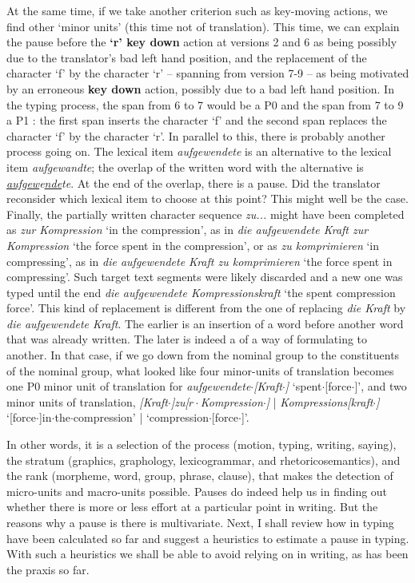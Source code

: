 \documentclass[output=paper]{LSP/langsci}
\begin{document}
  
At the same time, if we take another criterion such as key-moving actions, we find other `minor units' (this time not of translation). This time, we can explain the pause before the \textbf{`r' key down} action at versions 2 and 6 as being possibly due to the translator's bad left hand position, and the replacement of the character `f' by the character `r' -- spanning from version 7-9 -- as being motivated by an erroneous \textbf{key down} action, possibly due to a bad left hand position. In the typing process, the span from 6 to 7 would be a P0  and the span from 7 to 9 a P1 : the first span inserts the character `f' and the second span replaces the character `f' by the character `r'. In parallel to this, there is probably another process going on. The lexical item \emph{aufgewendete} is an alternative to the lexical item \emph{aufgewandte}; the overlap of the written word with the alternative is \emph{\uline{aufgew}e\uline{nde}te}. At the end of the overlap, there is a pause. Did the translator reconsider which lexical item to choose at this point? This might well be the case. Finally, the partially written character sequence \emph{zu...} might have been completed as \emph{zur Kompression} `in the compression', as in \emph{die aufgewendete Kraft zur Kompression} `the force spent in the compression', or as \emph{zu komprimieren} `in compressing', as in \emph{die aufgewendete Kraft zu komprimieren} `the force spent in compressing'. Such target text segments were likely discarded and a new one was typed until the end \emph{die aufgewendete Kompressionskraft} `the spent compression force'. This kind of replacement is different from the one of replacing \emph{die Kraft} by \emph{die aufgewendete Kraft}. The earlier  is an insertion of a word before another word that was already written. The later  is indeed a  of a way of formulating to another. In that case, if we go down from the nominal group to the constituents of the nominal group, what looked like four minor-units of translation becomes one P0 minor unit of translation for \emph{aufgewendete$\cdot${[}Kraft$\cdot${]}} `spent$\cdot${[}force$\cdot${]}', and two minor units of translation, \emph{{[}Kraft$\cdot${]}zu{[}$r\cdot$Kompression$\cdot${]}} | \emph{Kompressions{[}kraft$\cdot${]}} `{[}force$\cdot${]}in$\cdot$the$\cdot$compression' | `compression$\cdot${[}force$\cdot${]}'.

In other words, it is a selection of the process (motion, typing, writing, saying), the stratum (graphics, graphology, lexicogrammar, and rhetoricosemantics), and the rank (morpheme, word, group, phrase, clause), that makes the detection of micro-units and macro-units possible. Pauses do indeed help us in finding out whether there is more or less effort at a particular point in writing. But the reasons why a pause is there is multivariate. Next, I shall review how  in typing have been calculated so far and suggest a heuristics to estimate a pause in typing. With such a heuristics we shall be able to avoid relying on  in writing, as has been the praxis so far.
\end{document}
